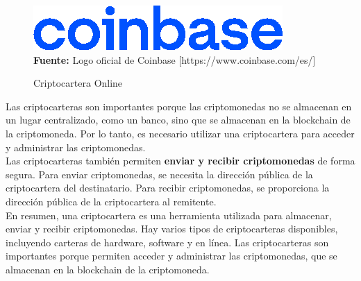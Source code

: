\hfill \break
\begin{figure}[htb!]
    \caption{Criptocartera Online}
    \label{fig:coinbase}
    \centering
    \includegraphics[scale=1]{./Ilustraciones/coinbase-logo.png}\\
    \textbf{Fuente:} Logo oficial de Coinbase  [https://www.coinbase.com/es/]
\end{figure}
Las criptocarteras son importantes porque las criptomonedas no se almacenan en 
un lugar centralizado, como un banco, sino que se almacenan en la blockchain de 
la criptomoneda. Por lo tanto, es necesario utilizar una criptocartera para 
acceder y administrar las criptomonedas.\\
\hfill \break
Las criptocarteras también permiten \textbf{enviar y recibir criptomonedas}
de forma segura. Para enviar criptomonedas, se necesita la dirección pública 
de la criptocartera del destinatario. Para recibir criptomonedas, se proporciona 
la dirección pública de la criptocartera al remitente.\\
\hfill \break
En resumen, una criptocartera es una herramienta utilizada para almacenar, 
enviar y recibir criptomonedas. Hay varios tipos de criptocarteras disponibles, 
incluyendo carteras de hardware, software y en línea. Las criptocarteras son 
importantes porque permiten acceder y administrar las criptomonedas, que se 
almacenan en la blockchain de la criptomoneda.